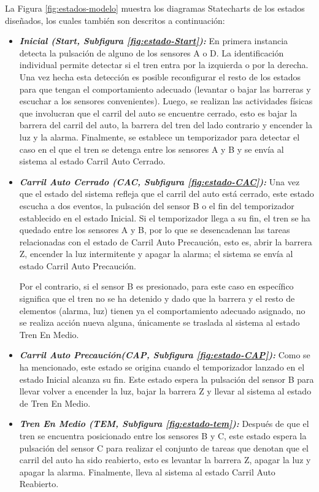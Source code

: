 \documentclass[journal]{IEEEtran}
\begin{document}
La Figura \ref{fig:estados-modelo} muestra los diagramas Statecharts de los estados diseñados, los cuales también son descritos a continuación:
\begin{itemize}
	\item \emph{\textbf{Inicial (Start, Subfigura \ref{fig:estado-Start}):}} En primera instancia detecta la pulsación de alguno de los sensores A o D.
	La identificación individual permite detectar si el tren entra por la izquierda o por la derecha.
	Una vez hecha esta detección es posible reconfigurar el resto de los estados para que tengan el comportamiento adecuado (levantar o bajar las barreras y escuchar a los sensores convenientes).
	Luego, se realizan las actividades físicas que involucran que el carril del auto se encuentre cerrado, esto es bajar la barrera del carril del auto, la barrera del tren del lado contrario y encender la luz y la alarma.
	Finalmente, se establece un temporizador para detectar el caso en el que el tren se detenga entre los sensores A y B y se envía al sistema al estado Carril Auto Cerrado.

	\item \emph{\textbf{Carril Auto Cerrado (CAC, Subfigura \ref{fig:estado-CAC}):} } Una vez que el estado del sistema refleja que el carril del auto está cerrado, este estado escucha a dos eventos, la pulsación del sensor B o el fin del temporizador establecido en el estado Inicial.
	Si el temporizador llega a su fin, el tren se ha quedado entre los sensores A y B, por lo que se desencadenan las tareas relacionadas con el estado de Carril Auto Precaución, esto es, abrir la barrera Z, encender la luz intermitente y apagar la alarma; el sistema se envía al estado Carril Auto Precaución.

	Por el contrario, si el sensor B es presionado, para este caso en específico significa que el tren no se ha detenido y dado que la barrera y el resto de elementos (alarma, luz) tienen ya el comportamiento adecuado asignado, no se realiza acción nueva alguna, únicamente se traslada al sistema al estado Tren En Medio.

	\item \emph{\textbf{Carril Auto Precaución(CAP, Subfigura \ref{fig:estado-CAP}):}} Como se ha mencionado, este estado se origina cuando el temporizador lanzado en el estado Inicial alcanza su fin.
	Este estado espera la pulsación del sensor B para llevar volver a encender la luz, bajar la barrera Z y llevar al sistema al estado de Tren En Medio.

	\item \emph{\textbf{Tren En Medio (TEM, Subfigura \ref{fig:estado-tem}):}} Después de que el tren se encuentra posicionado entre los sensores B y C, este estado espera la pulsación del sensor C para realizar el conjunto de tareas que denotan que el carril del auto ha sido reabierto, esto es levantar la barrera Z, apagar la luz y apagar la alarma.
	Finalmente, lleva al sistema al estado Carril Auto Reabierto.


\end{itemize}
\end{document}
